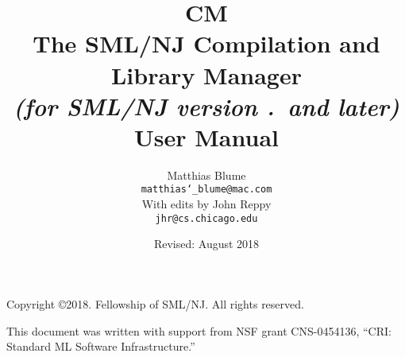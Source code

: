 \documentclass[titlepage,letterpaper]{report}
\author{
  Matthias Blume \\
  \texttt{matthias\char`\_blume@mac.com}\\[0.5em]
  With edits by John Reppy\\
  \texttt{jhr@cs.chicago.edu}}
\date{Revised: August 2018}
\title{
  \textbf{CM}\\
  The SML/NJ Compilation and Library Manager \\
  \textit{\small (for SML/NJ version \smlmj.\smlmn~and later)} \\
  User Manual
}
\begin{document}



\maketitle

\phantom{.}
\thispagestyle{empty}

\noindent Copyright \copyright{}2018.  Fellowship of SML/NJ.  All rights reserved.

\vskip 12pt
\noindent This document was written with support from NSF grant CNS-0454136,
``CRI: Standard ML Software Infrastructure.''

\pagebreak

\tableofcontents

\pagebreak



















\pagebreak



\pagebreak

\appendix









\end{document}
